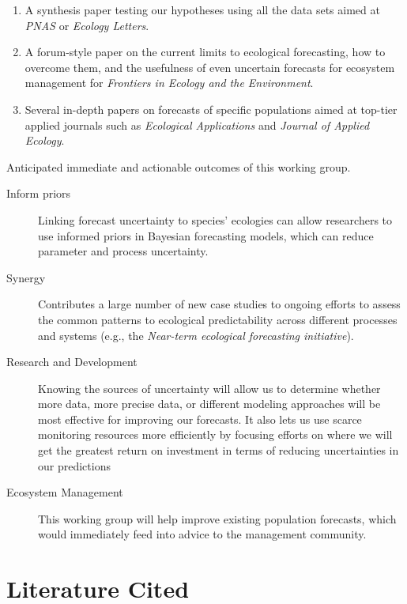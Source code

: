 \documentclass[12pt,]{article}
\providecommand{\tightlist}{%
  \setlength{\itemsep}{0pt}\setlength{\parskip}{0pt}}
\begin{document}
\begin{enumerate}
\def\labelenumi{\arabic{enumi}.}
\tightlist
\item
  A synthesis paper testing our hypotheses using all the data sets aimed
  at \emph{PNAS} or \emph{Ecology Letters}.
\item
  A forum-style paper on the current limits to ecological forecasting,
  how to overcome them, and the usefulness of even uncertain forecasts
  for ecosystem management for \emph{Frontiers in Ecology and the
  Environment}.
\item
  Several in-depth papers on forecasts of specific populations aimed at
  top-tier applied journals such as \emph{Ecological Applications} and
  \emph{Journal of Applied Ecology}.
\end{enumerate}

\begin{Box}[!b]
  \renewcommand{\arraystretch}{1.04}
  \caption{Anticipated immediate and actionable outcomes of this working group.}
  \footnotesize
  \begin{description}
  \item[Inform priors] Linking forecast uncertainty to species' ecologies can allow researchers to use informed priors in Bayesian forecasting models, which can reduce parameter and process uncertainty.
  \item[Synergy] Contributes a large number of new case studies to ongoing efforts to assess the common patterns to ecological predictability across different processes and systems (e.g., the \emph{Near-term ecological forecasting initiative}).
  \item[Research and Development] Knowing the sources of uncertainty will allow us to determine whether more data, more precise data, or different modeling approaches will be most effective for improving our forecasts. It also lets us use scarce monitoring resources more efficiently by focusing efforts on where we will get the greatest return on investment in terms of reducing uncertainties in our predictions
  \item[Ecosystem Management] This working group will help improve existing population forecasts, which would immediately feed into advice to the management community.
  \end{description} 

  \renewcommand{\arraystretch}{1.0}
\end{Box}

\hypertarget{literature-cited}{%
\section*{Literature Cited}\label{literature-cited}}
\end{document}
